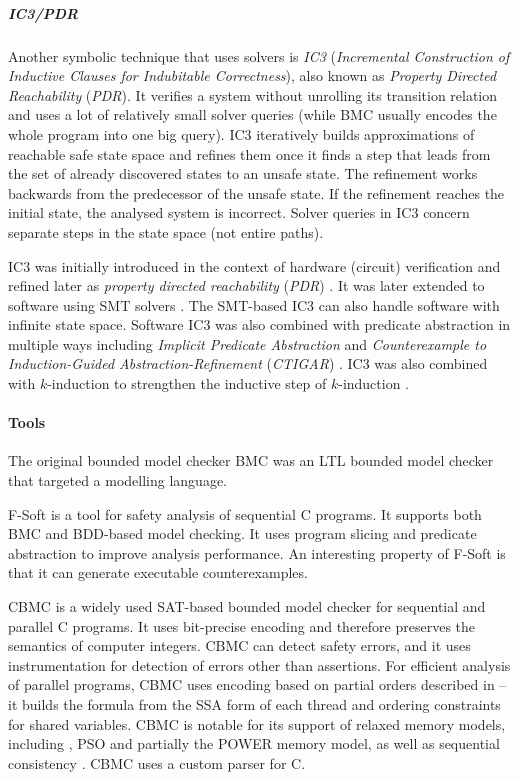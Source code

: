 \subparagraph{IC3/PDR}

Another symbolic technique that uses solvers is \emph{IC3} (\emph{Incremental Construction of Inductive Clauses for Indubitable Correctness}), also known as \emph{Property Directed Reachability} (\emph{PDR}).
It verifies a system without unrolling its transition relation and uses a lot of relatively small solver queries (while BMC usually encodes the whole program into one big query).
IC3 iteratively builds approximations of reachable safe state space and refines them once it finds a step that leads from the set of already discovered states to an unsafe state.
The refinement works backwards from the predecessor of the unsafe state.
If the refinement reaches the initial state, the analysed system is incorrect.
Solver queries in IC3 concern separate steps in the state space (not entire paths).

IC3 was initially introduced in the context of hardware (circuit) verification  and refined later as \emph{property directed reachability} (\emph{PDR}) .
It was later extended to software using SMT solvers .
The SMT-based IC3 can also handle software with infinite state space.
Software IC3 was also combined with predicate abstraction in multiple ways including \emph{Implicit Predicate Abstraction}  and \emph{Counterexample to Induction-Guided Abstraction-Refinement} (\emph{CTIGAR}) .
IC3 was also combined with $k$-induction to strengthen the inductive step of $k$-induction .

\paragraph{Tools}

The original bounded model checker BMC  was an LTL bounded
model checker that targeted a modelling language.

F-Soft  is a tool for safety analysis of sequential C programs.
It supports both BMC and BDD-based model checking.
It uses program slicing and predicate abstraction to improve analysis performance.
An interesting property of F-Soft is that it can generate executable counterexamples.

CBMC  is a widely used SAT-based bounded
model checker for sequential and parallel C programs.
It uses bit-precise encoding and therefore preserves the semantics of computer
integers.
CBMC can detect safety errors, and it uses instrumentation for detection of
errors other than assertions.
For efficient analysis of parallel programs, CBMC uses encoding based on
partial orders described in  -- it builds the formula from
the SSA form of each thread and ordering constraints for shared variables.
CBMC is notable for its support of relaxed memory models, including \xtso,
PSO and partially the POWER memory model, as well as sequential consistency
.
CBMC uses a custom parser for C.

